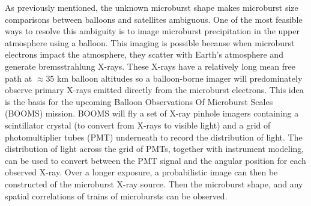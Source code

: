 As previously mentioned, the unknown microburst shape makes microburst size comparisons between balloons and satellites ambiguous. One of the most feasible ways to resolve this ambiguity is to image microburst precipitation in the upper atmosphere using a balloon. This imaging is possible because when microburst electrons impact the atmosphere, they scatter with Earth's atmosphere and generate bremsstrahlung X-rays. These X-rays have a relatively long mean free path at $\approx 35$ km balloon altitudes so a balloon-borne imager will predominately observe primary X-rays emitted directly from the microburst electrons. This idea is the basis for the upcoming Balloon Observations Of Microburst Scales (BOOMS) mission. BOOMS will fly a set of X-ray pinhole imagers containing a scintillator crystal (to convert from X-rays to visible light) and a grid of photomultiplier tubes (PMT) underneath to record the distribution of light. The distribution of light across the grid of PMTs, together with instrument modeling, can be used to convert between the PMT signal and the angular position for each observed X-ray. Over a longer exposure, a probabilistic image can then be constructed of the microburst X-ray source. Then the microburst shape, and any spatial correlations of trains of microbursts can be observed.